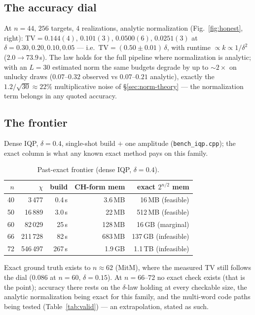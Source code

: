 \documentclass[11pt]{article}
\begin{document}
\subsection{The accuracy dial}\label{sec:precision}
At $n{=}44$, $256$ targets, $4$ realizations, analytic normalization
(Fig.~\ref{fig:honest}, right): $\mathrm{TV}=0.144(4),\,0.101(3),\,0.0500(6),
\,0.0251(3)$ at $\delta=0.30,0.20,0.10,0.05$ --- i.e.\
$\mathrm{TV}=(0.50\pm0.01)\,\delta$, with runtime
$\propto k\propto1/\delta^2$ ($2.0\to73.9$\,s). The law holds for the full
pipeline where normalization is analytic; with an $L{=}30$ estimated norm the
same budgets degrade by up to $\sim\!2\times$ on unlucky draws ($0.07$--$0.32$
observed vs $0.07$--$0.21$ analytic), exactly the
$1.2/\sqrt{30}\approx22\%$ multiplicative noise of \S\ref{sec:norm-theory}
--- the normalization term belongs in any quoted accuracy.

\subsection{The frontier}\label{sec:frontier}
Dense IQP, $\delta{=}0.4$, single-shot build $+$ one amplitude
(\texttt{bench\_iqp.cpp}); the exact column is what any known exact method
pays on this family.

\begin{table}[h]\centering
\caption{Past-exact frontier (dense IQP, $\delta{=}0.4$).}\label{tab:frontier}
\begin{tabular}{rrrrr}
\toprule
$n$ & $\chi$ & build & CH-form mem & exact $2^{n/2}$ mem \\
\midrule
40 & 3\,477   & 0.4\,s & 3.6\,MB  & 16\,MB (feasible) \\
50 & 16\,889  & 3.0\,s & 22\,MB   & 512\,MB (feasible) \\
60 & 82\,029  & 25\,s  & 128\,MB  & 16\,GB (marginal) \\
66 & 211\,728 & 82\,s  & 683\,MB  & 137\,GB (infeasible) \\
72 & 546\,497 & 267\,s & 1.9\,GB  & 1.1\,TB (infeasible) \\
\bottomrule
\end{tabular}
\end{table}

Exact ground truth exists to $n\!\approx\!62$ (MitM), where the measured TV
still follows the dial ($0.086$ at $n{=}60$, $\delta{=}0.15$). At
$n{=}66$--$72$ no exact check exists (that is the point); accuracy there
rests on the $\delta$-law holding at every checkable size, the analytic
normalization being exact for this family, and the multi-word code paths
being tested (Table~\ref{tab:valid}) --- an extrapolation, stated as such.
\end{document}
